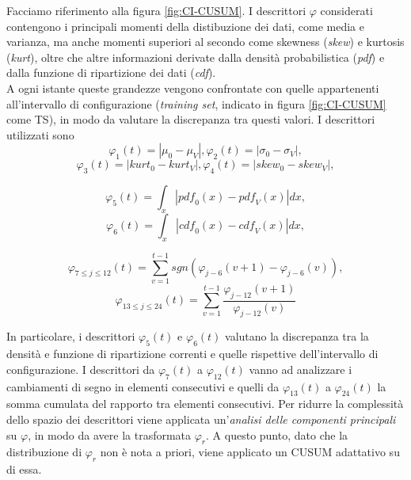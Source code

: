 				Facciamo riferimento alla figura \ref{fig:CI-CUSUM}. I descrittori $\varphi$ considerati contengono i principali momenti della distibuzione dei dati, come media e varianza, ma anche momenti superiori al secondo come skewness (\textit{skew}) e kurtosis (\textit{kurt}), oltre che altre informazioni derivate dalla densit\`a probabilistica (\textit{pdf}) e dalla funzione di ripartizione dei dati (\textit{cdf}).\\
				A ogni istante queste grandezze
                                vengono confrontate con quelle
                                appartenenti all'intervallo di
                                configurazione (\textit{training set},
                                indicato in figura \ref{fig:CI-CUSUM}
                                come TS), in modo da valutare la
                                discrepanza tra questi valori. I
                                descrittori utilizzati sono
				\[
                                \varphi_1(t)=|\mu_0-\mu_V|,\varphi_2(t)=|\sigma_0-\sigma_V|,\]
				\[\varphi_3(t)=|\textit{kurt}_0-\textit{kurt}_V|,\varphi_4(t)=|\textit{skew}_0-\textit{skew}_V|, \]
				
				\[\varphi_5(t)=\int_x|\textit{pdf}_0(x)-\textit{pdf}_V(x)|\textit{dx},\]
				\[\varphi_6(t)=\int_x|\textit{cdf}_0(x)-\textit{cdf}_V(x)|\textit{dx}, \]
				
				\[ \varphi_{7\leq j\leq 12}(t)=
                                \sum_{v=1}^{t-1}\textit{sgn}(\varphi_{j-6}(v+1)-\varphi_{j-6}(v)),\]
				\[\varphi_{13\leq j\leq 24}(t)=
                                \sum_{v=1}^{t-1}\frac{\varphi_{j-12}(v+1)}{\varphi_{j-12}(v)} \]
				
				In particolare, i descrittori
                                $\varphi_5(t)$ e $\varphi_6(t)$
                                valutano la discrepanza tra la
                                densit\`a e funzione di ripartizione
                                correnti e quelle rispettive
                                dell'intervallo di configurazione. I
                                descrittori da $\varphi_7(t)$ a
                                $\varphi_{12}(t)$ vanno ad analizzare
                                i cambiamenti di segno in elementi
                                consecutivi e quelli da
                                $\varphi_{13}(t)$ a $\varphi_{24}(t)$
                                la somma cumulata del rapporto tra
                                elementi consecutivi. Per ridurre la
                                complessit\`a dello spazio dei
                                descrittori viene applicata
                                un'\textit{analisi delle componenti
                                  principali} su $\varphi$, in modo da
                                avere la trasformata $\varphi_r$. A
                                questo punto, dato che la
                                distribuzione di $\varphi_r$ non \`e
                                nota a priori, viene applicato un
                                CUSUM adattativo su di essa.
				
